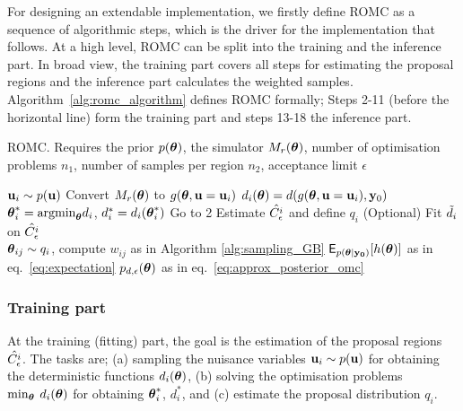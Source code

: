 For designing an extendable implementation, we firstly define ROMC as
a sequence of algorithmic steps, which is the driver for the
implementation that follows. At a high level, ROMC can be split into
the training and the inference part. In broad view, the training part
covers all steps for estimating the proposal regions and the inference
part calculates the weighted
samples. Algorithm~\ref{alg:romc_algorithm} defines ROMC formally;
Steps 2-11 (before the horizontal line) form the training part and
steps 13-18 the inference part.

\begin{algorithm}[!ht]
	\caption{ROMC. Requires the prior \( p(\boldsymbol{\theta}) \), the simulator
    \(M_r(\boldsymbol{\theta})\), number of optimisation problems \(n_1\), number
    of samples per region \(n_2\), acceptance limit
    \(\epsilon\)}\label{alg:romc_algorithm}
	\begin{algorithmic}[1]
    \State \(\mathbf{u}_i \sim p(\mathbf{u})\) 
    \State Convert \(M_r(\boldsymbol{\theta}) \) to \( g(\boldsymbol{\theta}, \mathbf{u}=\mathbf{u}_i) \) 
      \State \( d_i(\boldsymbol{\theta}) = d(g(\boldsymbol{\theta}, \mathbf{u}=\mathbf{u}_i), \mathbf{y}_0) \) 
      \State \(\boldsymbol{\theta}_i^* = \text{argmin}_{\boldsymbol{\theta}} d_i\), \(d_i^*=d_i(\boldsymbol{\theta}_i^*)\) 
        \State Go to 2 
      \EndIf
      \State Estimate \(\hat{C^i_{\epsilon}}\) and define \(q_i\) 
      \State (Optional) Fit \(\Tilde{d}_i\) on \(\hat{C^i_{\epsilon}}\) 
      \\\hrulefill
      \State \(\boldsymbol{\theta}_{ij} \sim q_i\), compute \(w_{ij}\) as in Algorithm \ref{alg:sampling_GB} 
      \EndFor
    \EndFor
    \State \(\mathsf{E}_{p(\boldsymbol{\theta}|\mathbf{y_0})}[h(\boldsymbol{\theta})]\) as in eq.~\eqref{eq:expectation} 
    \State \(p_{d,\epsilon}(\boldsymbol{\theta}) \) as in eq.~\eqref{eq:approx_posterior_omc} 
    \EndProcedure
	\end{algorithmic}
\end{algorithm}

\subsubsection*{Training part}
\noindent
At the training (fitting) part, the goal is the estimation of the
proposal regions \(\hat{C^i_{\epsilon}}\). The tasks are; (a) sampling
the nuisance variables \(\mathbf{u}_i \sim p(\mathbf{u})\) for obtaining the
deterministic functions \(d_i(\boldsymbol{\theta})\), (b) solving the optimisation
problems \(\min_{\boldsymbol{\theta}} \: d_i(\boldsymbol{\theta})\) for obtaining
\(\boldsymbol{\theta}_i^*\), \(d_i^*\), and (c) estimate the proposal distribution
\(q_i\).

